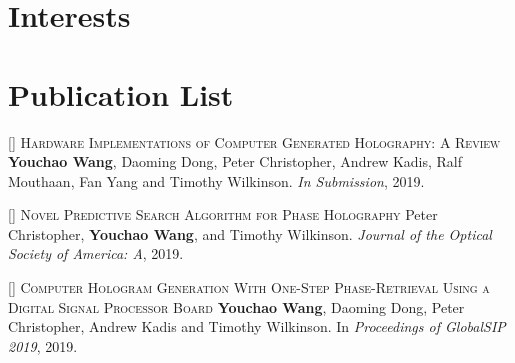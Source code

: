 \documentclass[11pt,a4paper]{moderncv}
\begin{document}
\vspace*{-0.2cm}

\vspace*{-0.8cm}

\section{Interests}
\vspace*{-0.2cm}

\vspace*{-0.4cm}

\section{Publication List}
\setcounter{counter}{1}

\textsc{[] Hardware Implementations of Computer Generated Holography: A Review}
\newline  \textbf{Youchao Wang}, Daoming Dong, Peter Christopher, Andrew Kadis, Ralf Mouthaan, Fan Yang and Timothy Wilkinson. \textit{In Submission}, 2019.

\addtocounter{counter}{1}

\textsc{[] Novel Predictive Search Algorithm for Phase Holography}
\newline Peter Christopher, \textbf{Youchao Wang}, and Timothy Wilkinson. \textit{Journal of the Optical Society of America: A}, 2019.

\addtocounter{counter}{1}

\textsc{[] Computer Hologram Generation With One-Step Phase-Retrieval Using a Digital Signal Processor Board}
\newline  \textbf{Youchao Wang}, Daoming Dong, Peter Christopher, Andrew Kadis and Timothy Wilkinson. In \textit{Proceedings of GlobalSIP 2019}, 2019.

\addtocounter{counter}{1}
\end{document}
